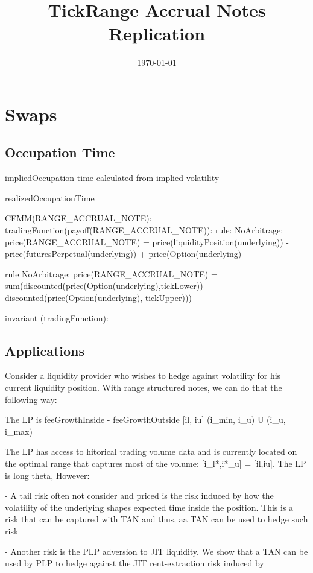 \documentclass[11pt]{article}
\title{TickRange Accrual Notes Replication}
\author{}
\date{\today}
\begin{document}
\maketitle
\tableofcontents


\section{Swaps}


\subsection{Occupation Time}
impliedOccupation time calculated from implied volatility

realizedOccupationTime


CFMM(RANGE_ACCRUAL_NOTE):
	tradingFunction(payoff(RANGE_ACCRUAL_NOTE)):
	rule: NoArbitrage: price(RANGE_ACCRUAL_NOTE) =  price(liquidityPosition(underlying))
        - price(futuresPerpetual(underlying))
						       	     + price(Option(underlying)

		rule NoArbitrage: price(RANGE_ACCRUAL_NOTE) =
	     		  sum(discounted(price(Option(underlying),tickLower))
			      - discounted(price(Option(underlying), tickUpper)))

		invariant (tradingFunction):



\subsection{Applications}

Consider a liquidity provider who wishes to hedge against volatility for his current liquidity position. With range structured notes, we can do that  the following way:

The LP is    feeGrowthInside -      feeGrowthOutside
                 [il, iu]        (i_min, i_u) U (i_u, i_max)              


                 The LP has access to  hitorical trading volume data and is currently located on the optimal range that captures most of the volume: [i_l*,i*_u] = [il,iu]. The LP is long theta, However:

                 - A tail risk often not consider and priced is the risk induced by how the volatility of the underlying shapes expected time inside the position. This is a risk that can be captured with TAN and thus, aa TAN can be used to hedge such risk

                 - Another risk is the PLP adversion to JIT liquidity. We show that a TAN can  be used by PLP to hedge against the JIT rent-extraction risk induced by
\end{document}
